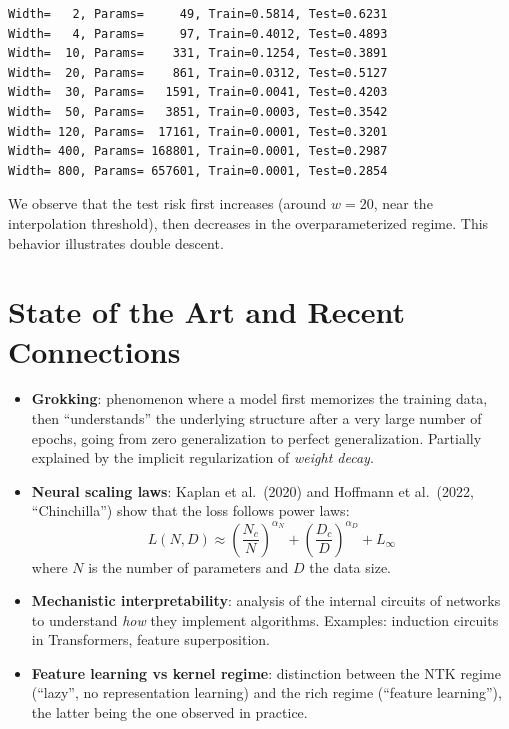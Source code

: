 \begin{codeoutput}
\begin{verbatim}
Width=   2, Params=     49, Train=0.5814, Test=0.6231
Width=   4, Params=     97, Train=0.4012, Test=0.4893
Width=  10, Params=    331, Train=0.1254, Test=0.3891
Width=  20, Params=    861, Train=0.0312, Test=0.5127
Width=  30, Params=   1591, Train=0.0041, Test=0.4203
Width=  50, Params=   3851, Train=0.0003, Test=0.3542
Width= 120, Params=  17161, Train=0.0001, Test=0.3201
Width= 400, Params= 168801, Train=0.0001, Test=0.2987
Width= 800, Params= 657601, Train=0.0001, Test=0.2854
\end{verbatim}
\end{codeoutput}

\begin{remark}
We observe that the test risk first increases (around $w = 20$,
near the interpolation threshold), then decreases in the
overparameterized regime. This behavior illustrates double descent.
\end{remark}

\section{State of the Art and Recent Connections}
\label{sec:theory-sota}

\begin{sota}[title=\textbf{Deep Learning Theory in 2024--2025}]
\begin{itemize}
    \item \textbf{Grokking}: phenomenon where a model
          first memorizes the training data, then
          ``understands'' the underlying structure after a very
          large number of epochs, going from zero generalization
          to perfect generalization. Partially explained by
          the implicit regularization of \emph{weight decay}.
    \item \textbf{Neural scaling laws}:
          Kaplan et al.\ (2020) and Hoffmann et al.\ (2022, ``Chinchilla'')
          show that the loss follows power laws:
          \begin{equation}
          L(N, D) \approx \left(\frac{N_c}{N}\right)^{\alpha_N} + \left(\frac{D_c}{D}\right)^{\alpha_D} + L_\infty
          \end{equation}
          where $N$ is the number of parameters and $D$ the data size.
    \item \textbf{Mechanistic interpretability}:
          analysis of the internal circuits of networks to understand
          \emph{how} they implement algorithms. Examples:
          induction circuits in Transformers, feature superposition.
    \item \textbf{Feature learning vs kernel regime}: distinction between
          the NTK regime (``lazy'', no representation learning)
          and the rich regime (``feature learning''), the latter being
          the one observed in practice.
\end{itemize}
\end{sota}

